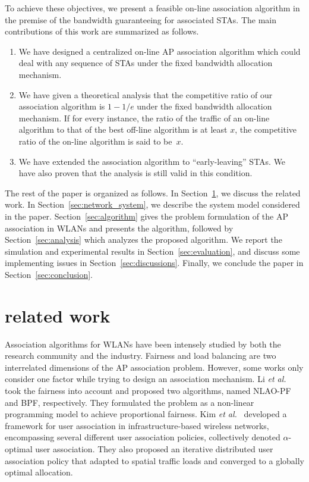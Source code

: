 \documentclass[conference]{IEEEtran}
\begin{document}
  To achieve these objectives, we present a feasible on-line association algorithm in the premise of the bandwidth guaranteeing for associated STAs.  The main contributions of this work are summarized as follows.
  \begin{enumerate}
    \item We have designed a centralized on-line AP association algorithm which could deal with any sequence of STAs under the fixed bandwidth allocation mechanism.
    \item We have given a theoretical analysis that the competitive ratio of our association algorithm is $1-1/e$ under the fixed bandwidth allocation mechanism.  If for every instance, the ratio of the traffic of an on-line algorithm to that of the best off-line algorithm is at least $x$, the competitive ratio of the on-line algorithm is said to be~$x$.
    \item We have extended the association algorithm to ``early-leaving'' STAs.  We have also proven that the analysis is still valid in this condition.
  \end{enumerate}

    The rest of the paper is organized as follows. In Section~\ref{sec:related_work}, we discuss the related work. In Section~\ref{sec:network_system}, we describe the system model considered in the paper. Section~\ref{sec:algorithm} gives the problem formulation of the AP association in WLANs and presents the algorithm, followed by Section~\ref{sec:analysis} which analyzes the proposed algorithm.  We report the simulation and experimental results in Section~\ref{sec:evaluation}, and discuss some implementing issues in Section~\ref{sec:discussions}.  Finally, we conclude the paper in Section~\ref{sec:conclusion}.


\section{related work}\label{sec:related_work}
  Association algorithms for WLANs have been intensely studied by both the research community and the industry.  Fairness and load balancing are two interrelated dimensions of the AP association problem.  However, some works only consider one factor while trying to design an association mechanism. Li \textit{et al.}~\cite{li2012ap} took the fairness into account and proposed two algorithms, named NLAO-PF and BPF, respectively. They formulated the problem as a non-linear programming model to achieve proportional fairness. Kim \textit{et al.}~\cite{kim2012distributed} developed a framework for user association in infrastructure-based wireless networks, encompassing several different user association policies, collectively denoted $\alpha$-optimal user association. They also proposed an iterative distributed user association policy that adapted to spatial traffic loads and converged to a globally optimal allocation.
\end{document}
